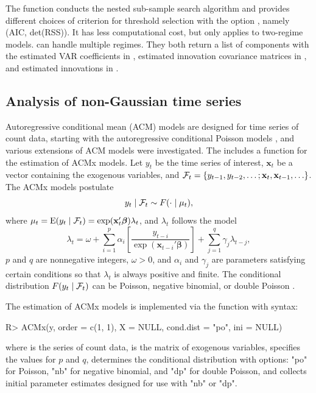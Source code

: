 The function  conducts the nested sub-sample search algorithm and provides different choices of criterion for threshold selection with the option , namely (AIC, det(RSS)). It has less computational cost, but only applies to two-regime models.  can handle multiple regimes. They both return a list of components with the estimated VAR coefficients in , estimated innovation covariance matrices in , and estimated innovations in .


\subsection{Analysis of non-Gaussian time series}
Autoregressive conditional mean (ACM) models are designed for time series of count data, starting with the autoregressive conditional Poisson models \citep{heinen2003}, and various extensions of ACM models were investigated. The  includes a function  for the estimation of ACMx models. Let $y_t$ be the time series of interest, $\mathbf{x}_t$ be a vector containing the exogenous variables, and ${\cal{F}}_t=\{ y_{t-1},y_{t-2},\ldots; \mathbf{x}_t, \mathbf{x}_{t-1},\ldots \}$. The ACMx models postulate
\[
y_t\mid {\cal F}_t \sim F(\cdot \mid \mu_t),
\]
where $\mu_t={\rm E}(y_t \mid {\cal F}_t)= \exp ({\mathbf x}_t' {\boldsymbol{\beta}})\lambda_t$,
and $\lambda_t$ follows the model
\[
\lambda_t=\omega+\sum_{i=1}^p \alpha_i\left[ \frac{y_{t-i}}{\exp(\mathbf{x}_{t-i}' \boldsymbol{\beta})}\right] +\sum_{j=1}^q \gamma_j \lambda_{t-j},
\]
$p$ and $q$ are nonnegative integers, $\omega>0$, and $\alpha_i$ and $\gamma_j$ are parameters satisfying certain conditions so that $\lambda_t$ is always positive and finite. The conditional distribution $F(y_t\mid {\cal F}_t)$ can be Poisson, negative binomial, or double Poisson \citep{tsay2018}.

The estimation of ACMx models is implemented via the function  with syntax:
\begin{example}
R> ACMx(y, order = c(1, 1), X = NULL, cond.dist = "po", ini = NULL)
\end{example}
where  is the series of count data,  is the matrix of exogenous variables,  specifies the values for $p$ and $q$,  determines the conditional distribution with options: "po" for Poisson, "nb" for negative binomial, and "dp" for double Poisson,
and  collects initial parameter estimates designed for use with "nb" or "dp".


